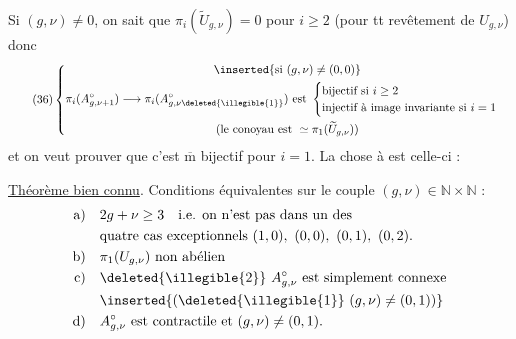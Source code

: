 Si $(g,\nu)\ne0$, on sait que $\pi_i(\widetilde U_{g,\nu})=0$ pour $i\geq2$ (pour tt revêtement de $U_{g,\nu}$) donc
\[
\tag{36}
\left\{\begin{gathered}
\inserted{\text{si }(g,\nu)\ne(0,0)}\\
\pi_i(A_{g,\nu+1}^{\circ})\longrightarrow\pi_i(A_{g,\nu\deleted{\illegible{1}}}^{\circ})
\text{ est }\begin{cases}
\text{bijectif si }i\geq2\\
\text{injectif à image invariante si }i=1
\end{cases}\\
\text{(le conoyau est }\simeq\pi_1(\widetilde U_{g,\nu})\text{)}
\end{gathered}\right.
\]
et on veut prouver que c'est $\overline{\mathrm m}$ bijectif pour $i=1$. La chose à   est celle-ci :



\uline{Théorème bien connu}. Conditions équivalentes sur le couple $(g,\nu)\in\mathbb N\times\mathbb N$ :
\[
\begin{aligned}
\text{a)}\quad &2g+\nu\geq3\quad\text{i.e. on n'est pas dans un des}\\
&\text{quatre cas exceptionnels }(1,0),\ (0,0),\ (0,1),\ (0,2).\\
\text{b)}\quad &\pi_1(U_{g,\nu})\text{ non abélien}\\
\text{c)}\quad &\deleted{\illegible{2}}\ A_{g,\nu}^{\circ}\text{ est simplement connexe}\\
&\inserted{\text{(}\deleted{\illegible{1}}\ (g,\nu)\ne(0,1)\text{)}}\\
\text{d)}\quad &A_{g,\nu}^{\circ}\text{ est contractile et }(g,\nu)\ne(0,1).
\end{aligned}
\]

